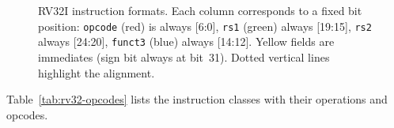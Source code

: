\documentclass[9pt, a4paper]{extarticle}
\begin{document}
\begin{figure}[htbp]
    \caption{RV32I instruction formats. Each column corresponds to a fixed bit position: \texttt{opcode} (red) is always [6:0], \texttt{rs1} (green) always [19:15], \texttt{rs2} always [24:20], \texttt{funct3} (blue) always [14:12]. Yellow fields are immediates (sign bit always at bit~31). Dotted vertical lines highlight the alignment.}
    \label{fig:rv32-formats}
\end{figure}

Table~\ref{tab:rv32-opcodes} lists the instruction classes with their operations and opcodes.
\end{document}
